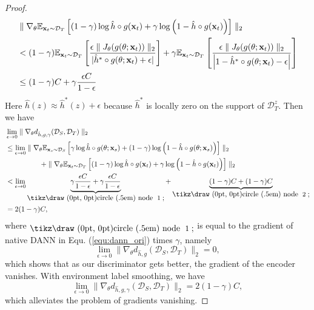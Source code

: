 \documentclass{article} \usepackage{iclr2023_conference,times}
\newcommand{\E}{\mathbb{E}}
\newcommand{\myref}[1]{Equ. (\ref{#1})}
\newcommand{\D}{\mathcal{D}}
\newcommand*{\circled}[1]{\lower.7ex\hbox{\tikz\draw (0pt, 0pt)circle (.5em) node {\makebox[1em][c]{\small #1}};}}
\begin{document}
\begin{proof}
\begin{equation}
\begin{aligned}
 & \parallel\nabla_\theta\E_{\x_t\sim \D_T}\left[(1-\gamma)\log \hat{h}\circ g(\x_t)+\gamma\log\left(1-\hat{h}\circ g(\x_t)\right) \right]\parallel_2\\
 &<  (1-\gamma)\E_{\x_t\sim \D_T}\left[\frac{\epsilon \parallel J_\theta(g(\theta;\x_t))\parallel_2}{|\hat{h}^*\circ g(\theta;\x_t)+\epsilon| }\right]
 +\gamma\E_{\x_t\sim \D_T}\left[\frac{\epsilon \parallel J_\theta(g(\theta;\x_t))\parallel_2}{\left|1-\hat{h}^*\circ g(\theta;\x_t)-\epsilon\right| } \right]\\
 &\leq (1-\gamma)C +\gamma\frac{\epsilon C }{1-\epsilon }
 \end{aligned}\end{equation}
Here $\hat{h}(z)\approx\hat{h}^*(z)+\epsilon$ because $\hat{h}^*$ is locally zero on the support of $\D^z_T$. Then we have 
\begin{equation}
\begin{aligned}
&\lim_{\epsilon\rightarrow0} \parallel\nabla_\theta d_{\hat{h},g,\gamma}(\D_S,\D_T) \parallel_2\\
&\leq \lim_{\epsilon\rightarrow0}\parallel\nabla_\theta\E_{\x_s\sim \D_S}\left[\gamma\log \hat{h}\circ g(\theta;\x_s)+(1-\gamma)\log\left(1-\hat{h}\circ g(\theta;\x_s)\right) \right] \parallel_2\\
&\quad\quad\quad\quad\quad + \parallel\nabla_\theta\E_{\x_t\sim \D_T}\left[(1-\gamma)\log \hat{h}\circ g(\x_t)+\gamma\log\left(1-\hat{h}\circ g(\x_t)\right) \right]\parallel_2\\
&< \lim_{\epsilon\rightarrow0} \underbrace{\gamma\frac{\epsilon C }{1-\epsilon }+\gamma\frac{\epsilon C }{1-\epsilon }}_{\rm \circled{\rm 1}}+\underbrace{(1-\gamma)C  + (1-\gamma)C }_{\rm \circled{\rm 2}}\\
&=2(1-\gamma)C ,
 \end{aligned}\end{equation}
where ${\rm \circled{\rm 1}}$ is equal to the gradient of native DANN in \myref{equ:dann_ori} times $\gamma$, namely
\begin{equation}
  \lim_{\epsilon\rightarrow0}\parallel\nabla_\theta d_{\hat{h},g}(\D_S,\D_T) \parallel_2=0,  
\end{equation}
which shows that as our discriminator gets better, the gradient of the encoder vanishes. With environment label smoothing, we have 
\begin{equation}
  \lim_{\epsilon\rightarrow0} \parallel\nabla_\theta d_{\hat{h},g,\gamma}(\D_S,\D_T) \parallel_2=2(1-\gamma)C,
\end{equation}
which alleviates the problem of gradients vanishing.
\end{proof}
\end{document}
